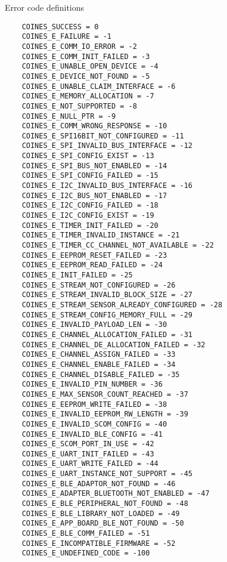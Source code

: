\documentclass{article}
\begin{document}
Error code definitions
\begin{lstlisting}
    COINES_SUCCESS = 0
    COINES_E_FAILURE = -1
    COINES_E_COMM_IO_ERROR = -2
    COINES_E_COMM_INIT_FAILED = -3
    COINES_E_UNABLE_OPEN_DEVICE = -4
    COINES_E_DEVICE_NOT_FOUND = -5
    COINES_E_UNABLE_CLAIM_INTERFACE = -6
    COINES_E_MEMORY_ALLOCATION = -7
    COINES_E_NOT_SUPPORTED = -8
    COINES_E_NULL_PTR = -9
    COINES_E_COMM_WRONG_RESPONSE = -10
    COINES_E_SPI16BIT_NOT_CONFIGURED = -11
    COINES_E_SPI_INVALID_BUS_INTERFACE = -12
    COINES_E_SPI_CONFIG_EXIST = -13
    COINES_E_SPI_BUS_NOT_ENABLED = -14
    COINES_E_SPI_CONFIG_FAILED = -15
    COINES_E_I2C_INVALID_BUS_INTERFACE = -16
    COINES_E_I2C_BUS_NOT_ENABLED = -17
    COINES_E_I2C_CONFIG_FAILED = -18
    COINES_E_I2C_CONFIG_EXIST = -19
    COINES_E_TIMER_INIT_FAILED = -20
    COINES_E_TIMER_INVALID_INSTANCE = -21
    COINES_E_TIMER_CC_CHANNEL_NOT_AVAILABLE = -22
    COINES_E_EEPROM_RESET_FAILED = -23
    COINES_E_EEPROM_READ_FAILED = -24
    COINES_E_INIT_FAILED = -25
    COINES_E_STREAM_NOT_CONFIGURED = -26
    COINES_E_STREAM_INVALID_BLOCK_SIZE = -27
    COINES_E_STREAM_SENSOR_ALREADY_CONFIGURED = -28
    COINES_E_STREAM_CONFIG_MEMORY_FULL = -29
    COINES_E_INVALID_PAYLOAD_LEN = -30
    COINES_E_CHANNEL_ALLOCATION_FAILED = -31
    COINES_E_CHANNEL_DE_ALLOCATION_FAILED = -32
    COINES_E_CHANNEL_ASSIGN_FAILED = -33
    COINES_E_CHANNEL_ENABLE_FAILED = -34
    COINES_E_CHANNEL_DISABLE_FAILED = -35
    COINES_E_INVALID_PIN_NUMBER = -36
    COINES_E_MAX_SENSOR_COUNT_REACHED = -37
    COINES_E_EEPROM_WRITE_FAILED = -38
    COINES_E_INVALID_EEPROM_RW_LENGTH = -39
    COINES_E_INVALID_SCOM_CONFIG = -40
    COINES_E_INVALID_BLE_CONFIG = -41
    COINES_E_SCOM_PORT_IN_USE = -42
    COINES_E_UART_INIT_FAILED = -43
    COINES_E_UART_WRITE_FAILED = -44
    COINES_E_UART_INSTANCE_NOT_SUPPORT = -45
    COINES_E_BLE_ADAPTOR_NOT_FOUND = -46
    COINES_E_ADAPTER_BLUETOOTH_NOT_ENABLED = -47
    COINES_E_BLE_PERIPHERAL_NOT_FOUND = -48
    COINES_E_BLE_LIBRARY_NOT_LOADED = -49
    COINES_E_APP_BOARD_BLE_NOT_FOUND = -50
    COINES_E_BLE_COMM_FAILED = -51
    COINES_E_INCOMPATIBLE_FIRMWARE = -52
    COINES_E_UNDEFINED_CODE = -100
\end{lstlisting}
\end{document}

